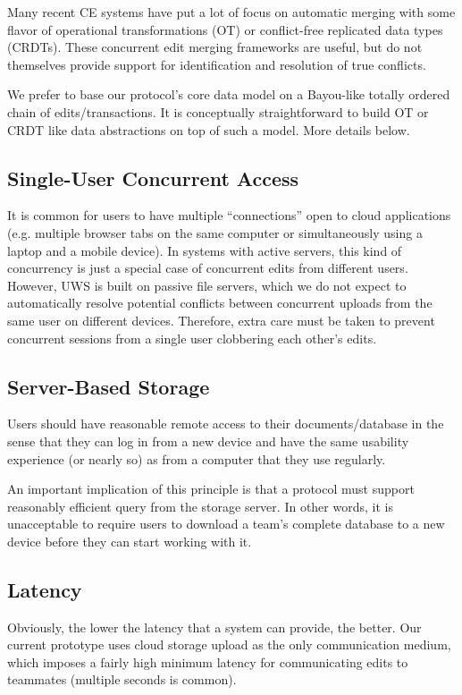\documentclass{article}
\begin{document}
Many recent CE systems have put a lot of focus on automatic merging with some flavor of operational transformations (OT) or conflict-free replicated data types (CRDTs).
These concurrent edit merging frameworks are useful, but do not themselves provide support for identification and resolution of true conflicts.

We prefer to base our protocol's core data model on a Bayou-like totally ordered chain of edits/transactions.
It is conceptually straightforward to build OT or CRDT like data abstractions on top of such a model.
More details below.

\subsection{Single-User Concurrent Access}

It is common for users to have multiple ``connections'' open to cloud applications (e.g. multiple browser tabs on the same computer or simultaneously using a laptop and a mobile device).
In systems with active servers, this kind of concurrency is just a special case of concurrent edits from different users.
However, UWS is built on passive file servers, which we do not expect to automatically resolve potential conflicts between concurrent uploads from the same user on different devices.
Therefore, extra care must be taken to prevent concurrent sessions from a single user clobbering each other's edits.

\subsection{Server-Based Storage}

Users should have reasonable remote access to their documents/database in the sense that they can log in from a new device and have the same usability experience (or nearly so) as from a computer that they use regularly.

An important implication of this principle is that a protocol must support reasonably efficient query from the storage server.
In other words, it is unacceptable to require users to download a team's complete database to a new device before they can start working with it.

\subsection{Latency}

Obviously, the lower the latency that a system can provide, the better.
Our current prototype uses cloud storage upload as the only communication medium, which imposes a fairly high minimum latency for communicating edits to teammates (multiple seconds is common).
\end{document}
